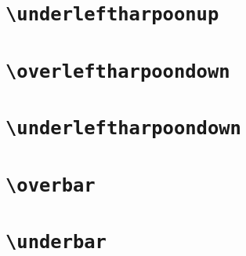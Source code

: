 \documentclass[12pt]{article}
\begin{document}
\begin{dispExample}
\end{dispExample}

\section{\texttt{\textbackslash underleftharpoonup}}

\begin{dispExample}
\end{dispExample}

\section{\texttt{\textbackslash overleftharpoondown}}

\begin{dispExample}
\end{dispExample}

\section{\texttt{\textbackslash underleftharpoondown}}

\begin{dispExample}
\end{dispExample}

\section{\texttt{\textbackslash overbar}}

\begin{dispExample}
\end{dispExample}

\section{\texttt{\textbackslash underbar}}

\begin{dispExample}
\end{dispExample}
\end{document}
